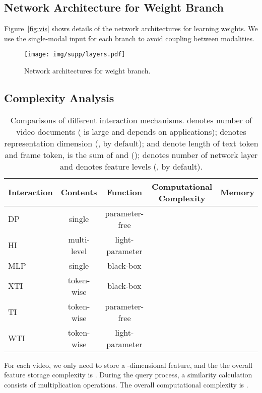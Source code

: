 \documentclass[runningheads]{llncs}
\begin{document}
\subsection{Network Architecture for Weight Branch}

Figure~\ref{fig:vis} shows details of the network architectures for learning weights. 
We use the single-modal input for each branch to avoid coupling between modalities.

\begin{figure}[h]
\centering
\centering
\texttt{[image: img/supp/layers.pdf]}
\caption{Network architectures for weight branch.}
\label{fig:weight}
\end{figure}


\subsection{Complexity Analysis}

\begin{table}[t]
\centering
\caption{Comparisons of different interaction mechanisms.  denotes number of video documents ( is large and depends on applications);  denotes representation dimension (, by default);  and  denote length of text token and frame token,  is the sum of  and  ();  denotes number of network layer and  denotes feature levels (, by default).}
\begin{tabular}{l|c|c| c|c}
\toprule
Interaction & Contents    & Function          & Computational Complexity           & Memory   \\
\hline
DP   & single  & parameter-free       &               &   \\
HI                   & multi-level    & light-parameter &              &  \\
MLP                   & single    & black-box            &         &   \\
XTI      & token-wise   & black-box            &  &  \\
TI                    & token-wise   & parameter-free       &             &  \\
WTI                   & token-wise   & light-parameter &             & \\
\bottomrule
\end{tabular}
\label{tab:cmp2}
\end{table}

For each video, we only need to store a -dimensional feature, and the the overall feature storage complexity is .
During the query process, a similarity calculation consists of  multiplication operations.
The overall computational complexity is  .
\end{document}
